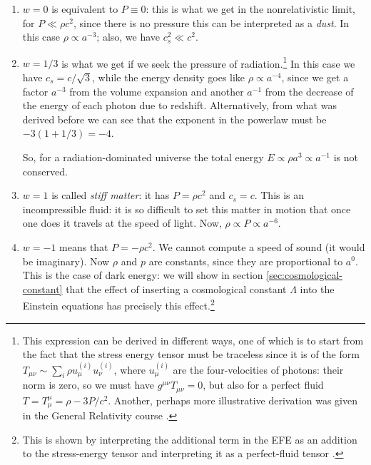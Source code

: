 \documentclass[main.tex]{subfiles}
\begin{document}
\begin{enumerate}
  \item \(w = 0\) is equivalent to \(P \equiv 0\): this is what we get in the nonrelativistic limit, for \(P \ll \rho c^2\), since there is no pressure this can be interpreted as a \emph{dust}. In this case \(\rho \propto a^{-3}\); also, we have \(c_s^2 \ll c^2\). 
  \item \(w = 1/3\) is what we get if we seek the pressure of radiation.\footnote{This expression can be derived in different ways, one of which is to start from the fact that the stress energy tensor must be traceless since it is of the form \(T_{\mu \nu } \sim \sum _{i} \rho u^{(i)}_{\mu } u^{(i)}_{\nu }\), where \(u_{\mu }^{(i)}\) are the four-velocities of photons: their norm is zero, so we must have \(g^{\mu \nu} T_{\mu \nu } = 0\), but also for a perfect fluid \(T = T^{\mu }_{\mu } = \rho - 3 P/c^2\). Another, perhaps more illustrative derivation was given in the General Relativity course \cite[pag. 86-87]{tissinoGeneralRelativityNotes2020}.}
  In this case we have \(c_s = c/ \sqrt{3}\), while the energy density goes like \(\rho \propto a^{-4}\), since we get a factor \(a^{-3}\) from the volume expansion and another \(a^{-1}\) from the decrease of the energy of each photon due to redshift. 
  Alternatively, from what was derived before we can see that the exponent in the powerlaw must be \(- 3(1+1/3) = -4\).
  
  So, for a radiation-dominated universe the total energy \(E \propto \rho a^{3} \propto a^{-1}\) is not conserved. 
  \item \(w=1\) is called \emph{stiff matter}: it has \(P = \rho c^2\) and  \(c_s = c\). 
  This is an incompressible fluid: it is so difficult to set this matter in motion that once one does it travels at the speed of light. Now, \(\rho \propto P \propto a^{-6}\). 
  \item \(w=-1\) means that \(P = - \rho c^2\). We cannot compute a speed of sound (it would be imaginary).
  Now \(\rho\) and \(p\) are constants, since they are proportional to \(a^{0}\). This is the case of dark energy: we will show in section \ref{sec:cosmological-constant} that the effect of inserting a cosmological constant \(\Lambda\) into the Einstein equations has precisely this effect.\footnote{This is shown by interpreting the additional term in the EFE as an addition to the stress-energy tensor and interpreting it as a perfect-fluid tensor \cite[eqs. 434-438]{tissinoGeneralRelativityNotes2020}.}
\end{enumerate}
\end{document}
